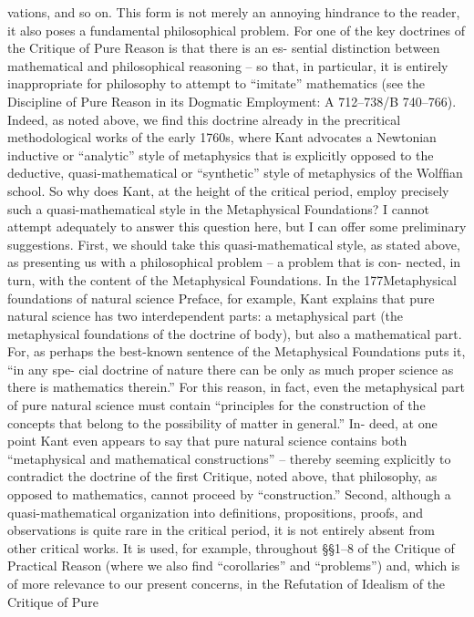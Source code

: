 vations, and so on. This form is not merely an annoying hindrance to
the reader, it also poses a fundamental philosophical problem. For one
of the key doctrines of the Critique of Pure Reason is that there is an es-
sential distinction between mathematical and philosophical reasoning –
so that, in particular, it is entirely inappropriate for philosophy to
attempt to “imitate” mathematics (see the Discipline of Pure Reason
in its Dogmatic Employment: A 712–738/B 740–766). Indeed, as noted
above, we ﬁnd this doctrine already in the precritical methodological
works of the early 1760s, where Kant advocates a Newtonian inductive or
“analytic” style of metaphysics that is explicitly opposed to the deductive,
quasi-mathematical or “synthetic” style of metaphysics of the Wolfﬁan
school. So why does Kant, at the height of the critical period, employ
precisely such a quasi-mathematical style in the Metaphysical Foundations?
I cannot attempt adequately to answer this question here, but I can offer
some preliminary suggestions.
First, we should take this quasi-mathematical style, as stated above,
as presenting us with a philosophical problem – a problem that is con-
nected, in turn, with the content of the Metaphysical Foundations. In the
177Metaphysical foundations of natural science
Preface, for example, Kant explains that pure natural science has two
interdependent parts: a metaphysical part (the metaphysical foundations
of the doctrine of body), but also a mathematical part. For, as perhaps the
best-known sentence of the Metaphysical Foundations puts it, “in any spe-
cial doctrine of nature there can be only as much proper science as there
is mathematics therein.” For this reason, in fact, even the metaphysical
part of pure natural science must contain “principles for the construction
of the concepts that belong to the possibility of matter in general.” In-
deed, at one point Kant even appears to say that pure natural science
contains both “metaphysical and mathematical constructions” – thereby
seeming explicitly to contradict the doctrine of the ﬁrst Critique, noted
above, that philosophy, as opposed to mathematics, cannot proceed by
“construction.”
Second, although a quasi-mathematical organization into deﬁnitions,
propositions, proofs, and observations is quite rare in the critical period,
it is not entirely absent from other critical works. It is used, for example,
throughout §§1–8 of the Critique of Practical Reason (where we also ﬁnd
“corollaries” and “problems”) and, which is of more relevance to our
present concerns, in the Refutation of Idealism of the Critique of Pure
